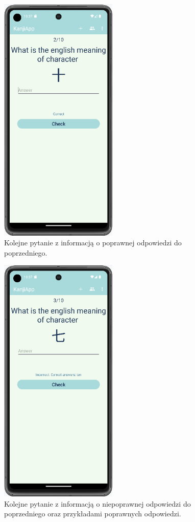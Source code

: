 \documentclass[a4paper,twoside,12pt]{book}
\begin{document}
\begin{figure}[]
\centering
\includegraphics[width=0.5\textwidth]{learn/correct}
\caption{Kolejne pytanie z informacją o poprawnej odpowiedzi do poprzedniego.}
\label{fig:correct}
\end{figure}

\begin{figure}[]
\centering
\includegraphics[width=0.5\textwidth]{learn/incorrect}
\caption{Kolejne pytanie z informacją o niepoprawnej odpowiedzi do poprzedniego oraz przykładami poprawnych odpowiedzi.}
\label{fig:incorrect}
\end{figure}
\end{document}
